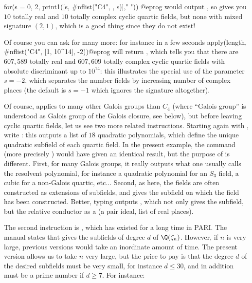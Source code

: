 \bprog
for(s = 0, 2, print1([s, #nflist("C4", , s)]," "))
@eprog\noindent
would output \kbd{[0, 10] [1, 0], [2, 10]}, so  gives you
$10$ totally real and $10$ totally complex cyclic quartic fields, but none
with mixed signature $(2,1)$, which is a good thing since they do not exist!

Of course you can ask for many more: for instance in a few seconds
\bprog apply(length, #nflist("C4", [1, 10^14], -2))@eprog
\noindent will return
\kbd{[607589, 0, 607609]}, which tells you that there are $607,589$ totally
real and $607,609$ totally complex cyclic quartic fields with absolute
discriminant up to $10^{14}$: this illustrates the special use of the
parameter $s=-2$, which separates the number fields by increasing number of
complex places (the default is $s=-1$ which ignores the signature altogether).

\smallskip

Of course,  applies to many other Galois groups than $C_4$
(where ``Galois group'' is understood as Galois group of the Galois closure,
see below), but before leaving cyclic quartic fields, let us see two more
related instructions. Starting again with , write
: this outputs a list of $18$ quadratic
polynomials, which define the unique quadratic subfield of each quartic
field. In the present example, the  command
(more precisely )
would have given an identical result, but the purpose of 
is different. First, for many Galois groups, it really outputs what one usually
calls the resolvent polynomial, for instance a quadratic polynomial for
an $S_3$ field, a cubic for a non-Galois quartic, etc... Second, as here,
the fields are often constructed as extensions of subfields, and
 gives the subfield on which the field has been constructed.
Better, typing  outputs
, which not only gives the
subfield, but the relative conductor as a  (a pair ideal,
list of real places).

The second instruction is , which has existed for a long time
in PARI. The manual states that  gives the subfields
of degree $d$ of $\Q(\zeta_n)$. However, if $n$ is very large, previous
versions would take an inordinate amount of time. The present version
allows us to take $n$ very large, but the price to pay is that the degree
$d$ of the desired subfields must be very small, for instance $d\le30$,
and in addition must be a prime number if $d\ge7$. For instance:

